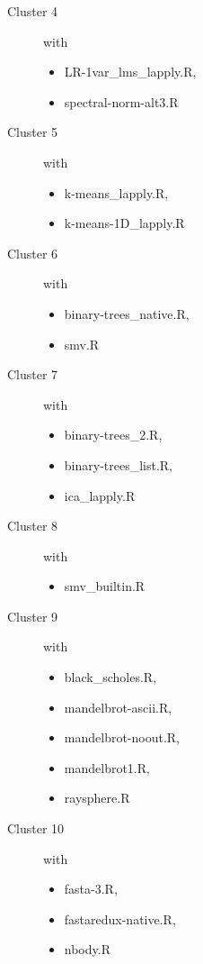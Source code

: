 \documentclass[12pt]{article}
\begin{document}
{\begin{description}
\item[Cluster 4] with
 \begin{itemize}
\item LR-1var\_lms\_lapply.R, 
\item spectral-norm-alt3.R
 \end{itemize}

\item[Cluster 5] with
 \begin{itemize}
\item k-means\_lapply.R, 
\item k-means-1D\_lapply.R
 \end{itemize}

\item[Cluster 6] with
 \begin{itemize}
\item binary-trees\_native.R, 
\item smv.R
 \end{itemize}

\item[Cluster 7] with
 \begin{itemize}
\item binary-trees\_2.R, 
\item binary-trees\_list.R, 
\item ica\_lapply.R
 \end{itemize}

\item[Cluster 8] with
 \begin{itemize}
\item smv\_builtin.R
 \end{itemize}

\item[Cluster 9] with
 \begin{itemize}
\item black\_scholes.R, 
\item mandelbrot-ascii.R, 
\item mandelbrot-noout.R, 
\item mandelbrot1.R, 
\item raysphere.R
 \end{itemize}

\item[Cluster 10] with
 \begin{itemize}
\item fasta-3.R, 
\item fastaredux-native.R, 
\item nbody.R
 \end{itemize}


\end{description}}
\end{document}
